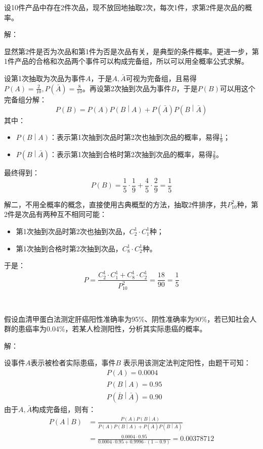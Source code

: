 \begin{example}
设10件产品中存在2件次品，现不放回地抽取2次，每次1件，求第2件是次品的概率。
\end{example}

解：

显然第2件是否为次品和第1件为否是次品有关，是典型的条件概率。更进一步，第1件产品的合格和次品两个事件可以构成完备组，所以可以用全概率公式求解。

设第1次抽取为次品为事件$A$，于是$A,\bar{A}$可视为完备组，且易得$P\left( A \right) =\frac{2}{10},P\left( \bar{A} \right) =\frac{8}{10}$。再设第2次抽到次品为事件$B$，于是$P\left( B \right) $可以用这个完备组分解：
\[
P\left( B \right) =P\left( A \right) P\left( B \middle| A \right) +P\left( \bar{A} \right) P\left( B \middle| \bar{A} \right)
\]
其中：
\begin{itemize}
    \item $P\left( B \middle| A \right) $：表示第1次抽到次品时第2次也抽到次品的概率，易得$\frac{1}{9}$；
    \item $P\left( B \middle| \bar{A} \right) $：表示第1次抽到合格时第2次抽到次品的概率，易得$\frac{2}{9}$。
\end{itemize}
最终得到：
\[
P\left( B \right) =\frac{1}{5}\cdot \frac{1}{9}+\frac{4}{5}\cdot \frac{2}{9}=\frac{1}{5}
\]

解二，不用全概率的概念，直接使用古典概型的方法，抽取2件排序，共$P_{10}^{2}$种，第2件是次品有两种互不相同可能：
\begin{itemize}
    \item 第1次抽到次品时第2次也抽到次品，$C_{2}^{1}\cdot C_{1}^{1}$种；
    \item 第1次抽到合格时第2次抽到次品，$C_{8}^{1}\cdot C_{2}^{1}$种。
\end{itemize}
于是：
\[
P=\frac{C_{2}^{1}\cdot C_{1}^{1}+C_{8}^{1}\cdot C_{2}^{1}}{P_{10}^{2}}=\frac{18}{90}=\frac{1}{5}
\]

~

\begin{example}
假设血清甲蛋白法测定肝癌阳性准确率为95\%、阴性准确率为90\%，若已知社会人群的患癌率为0.04\%，若某人检测阳性，分析其实际患癌的概率。
\end{example}

解：

设事件$A$表示被检者实际患癌，事件$B$ 表示用该测定法判定阳性，由题干可知：
\begin{align*}
&P\left( A \right) =0.0004 \\
&P\left( B \middle| A \right) =0.95 \\
&P\left( \bar{B} \middle| \bar{A} \right) =0.90
\end{align*}
由于$A,\bar{A}$构成完备组，则有：
\begin{align*}
P\left( A \middle| B \right) &=\frac{P\left( A \right) P\left( B \middle| A \right)}{P\left( A \right) P\left( B \middle| A \right) +P\left( \bar{A} \right) P\left( B \middle| \bar{A} \right)} \\
&=\frac{0.0004\cdot 0.95}{0.0004\cdot 0.95+0.9996\cdot \left( 1-0.9 \right)} =0.00378712
\end{align*}

